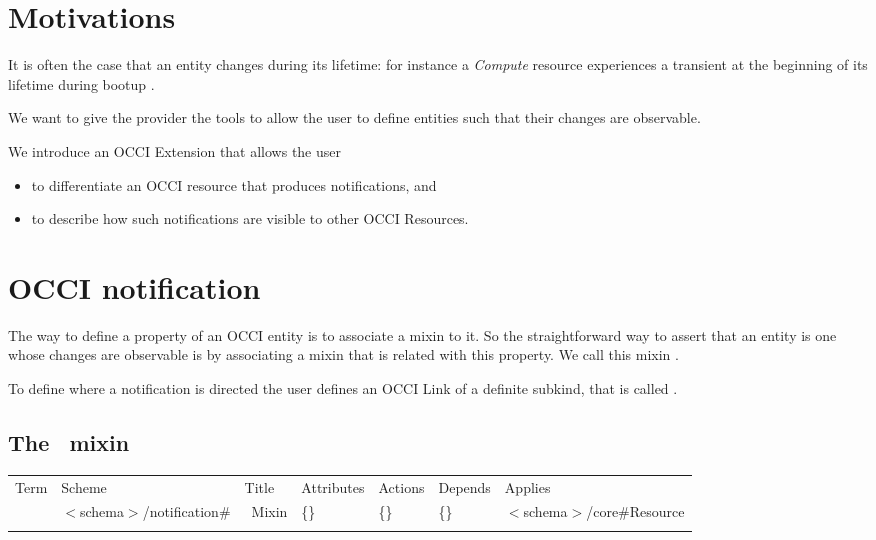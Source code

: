 \documentclass[10pt,a4paper]{article}
\begin{document}
\section{Motivations}

It is often the case that an entity changes during its lifetime: for instance a {\em Compute} resource experiences a transient at the beginning of its lifetime during bootup \cite{occi:infrastructure}.

We want to give the provider the tools to allow the user to define entities such that their changes are observable.

We introduce an OCCI Extension that allows the user

\begin{itemize} 
\item to differentiate an OCCI resource that produces notifications, and 
\item to describe how such notifications are visible to other OCCI Resources.
\end{itemize}

\section{OCCI notification}

The way to define a property of an OCCI entity is to associate a mixin to it. So the straightforward way to assert that an entity is one whose changes are observable is by associating a mixin that is related with this property. We call this mixin \smx.

To define where a notification is directed the user defines an OCCI Link of a definite subkind, that is called \ntfl.



\subsection{The \smx\ mixin}

 {
	\begin{tabular}{lllllll}
	\toprule
	Term & Scheme & Title & Attributes & Actions & Depends & Applies \\
	\colrule
	\smx &  $<$schema$>$/notification\# & \smx\ Mixin 
	& \{\} & \{\} & \{\} & $<$schema$>$/core\#Resource \\
	\botrule
	\end{tabular}
}
\end{document}
